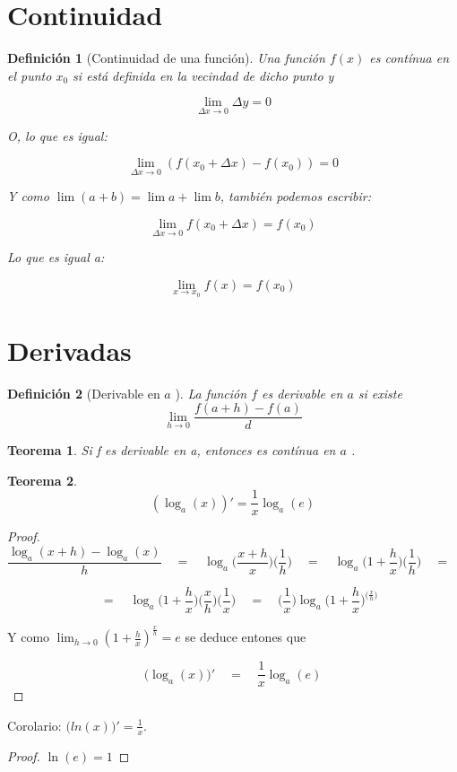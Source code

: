 \documentclass[12pt,a4paper]{extarticle}
\newtheorem{theorem}{Teorema}[section]
\newtheorem{mydef}{Definici\'on}[section]
\begin{document}
\section{Continuidad}

\begin{mydef}[Continuidad de una funci\'on]

Una funci\'on \( f(x) \) es \emph{cont\'inua} en el punto \( x_0 \) si
est\'a definida en la vecindad de dicho punto y

\[ \lim_{\Delta x \to 0} \Delta y = 0 \]

O, lo que es igual:


\[ \lim_{\Delta x \to 0} (f(x_0+\Delta x)-f(x_0)) = 0 \]

Y como \( \lim(a+b) = \lim a + \lim b \), tambi\'en podemos escribir:

\[ \lim_{\Delta x \to 0} f(x_0+ \Delta x) = f(x_0) \]

Lo que es igual a:

\[ \lim_{x \to x_0} f(x) = f(x_0) \]
\end{mydef}

\section{Derivadas}

\begin{mydef}[Derivable en \( a \) ]
La funci\'on \( f \) es \emph{derivable en} \( a \)  si existe
\[ \lim_{h \to 0} \frac{f(a+h)-f(a)}{d} \]
\end{mydef}

\begin{theorem}
Si f es derivable en a, entonces es cont\'inua en \( a \) .
\end{theorem}

\begin{theorem}
\[ (\log_a(x))' = \frac{1}{x}\log_a(e) \]
\end{theorem}
\begin{proof}

\[ \frac{\log_a(x+h)-\log_a(x)}{h} \quad = \quad
\log_a\Big(\frac{x+h}{x}\Big)\Big(\frac{1}{h}\Big) \quad = \quad
\log_a\Big(1+\frac{h}{x}\Big)\Big(\frac{1}{h}\Big) \quad = \quad
 \]


\[  \quad = \quad \log_a\Big(1+\frac{h}{x}\Big)\Big(\frac{x}{h}\Big)\Big(\frac{1}{x}\Big)
 \quad = \quad
 \Big(\frac{1}{x}\Big)\log_a\Big(1+\frac{h}{x}\Big)^{\Big(\frac{x}{h}\Big)} \]

Y como \( \lim_{h \to 0}(1+\frac{h}{x})^{\frac{x}{h}}  =  e \) se
deduce entones que


\[ \Big(\log_a(x)\Big)' \quad = \quad \frac{1}{x} \log_a(e) \]
\end{proof}
Corolario: \( \Big( ln(x) \Big)' = \frac{1}{x}.  \)
\begin{proof}
\( \ln(e)=1 \)
\end{proof}
\end{document}
